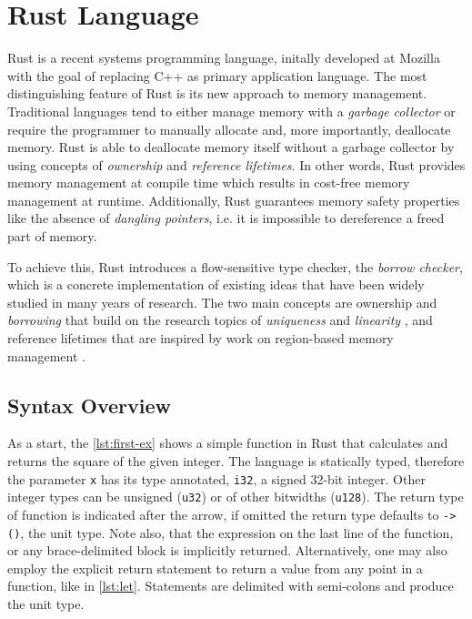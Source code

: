 \section{Rust Language}

Rust \cite{rust2, rust1} is a recent systems programming language, initally
developed at Mozilla with the goal of replacing C++ as primary application
language. The most distinguishing feature of Rust is its new approach to memory
management. Traditional languages tend to either manage memory with a
\emph{garbage collector} or require the programmer to manually allocate and,
more importantly, deallocate memory. Rust is able to deallocate memory itself
without a garbage collector by using concepts of \emph{ownership} and
\emph{reference lifetimes}. In other words, Rust provides memory management at
compile time which results in cost-free memory management at runtime.
Additionally, Rust guarantees memory safety properties like  the absence of
\emph{dangling pointers}, i.e. it is impossible to dereference a freed part of
memory.

To achieve this, Rust introduces a flow-sensitive type checker, the \emph{borrow
checker}, which is a concrete implementation of existing ideas that have been
widely studied in many years of research. The two main concepts are ownership
\cite{ownership-types} and \emph{borrowing} that build on the research topics of
\emph{uniqueness} \cite{alias-burying} and \emph{linearity}
\cite{Wadler90lineartypes, once-upon-a-type}, and reference lifetimes that are
inspired by work on region-based memory management \cite{cyclone-region}.


\subsection{Syntax Overview}

As a start, the \autoref{lst:first-ex} shows a simple function in Rust that
calculates and returns the square of the given integer. The language is
statically typed, therefore the parameter \lstinline!x! has its type annotated,
\lstinline!i32!, a signed 32-bit integer. Other integer types can be unsigned
(\lstinline!u32!) or of other bitwidths (\lstinline!u128!). The return type of
function is indicated after the arrow, if omitted the return type defaults to
\lstinline!-> ()!, the unit type. Note also, that the expression on the last
line of the function, or any brace-delimited block is implicitly returned.
Alternatively, one may also employ the explicit return statement to return a
value from any point in a function, like in \autoref{lst:let}. Statements
are delimited with semi-colons and produce the unit type.

